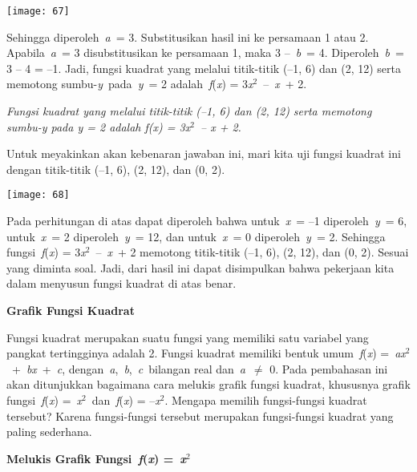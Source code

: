 \documentclass[11pt,fleqn]{book} %
\begin{document}
\begin{center}
\noindent \texttt{[image: 67]}
\end{center}

\noindent Sehingga diperoleh~\textit{a}~= 3. Substitusikan hasil ini ke persamaan 1 atau 2. Apabila~\textit{a}~= 3 disubstitusikan ke persamaan 1, maka 3 --~\textit{b}~= 4. Diperoleh~\textit{b}~= 3 -- 4 = --1. Jadi, fungsi kuadrat yang melalui titik-titik (--1, 6) dan (2, 12) serta memotong sumbu-\textit{y}~pada~\textit{y}~= 2 adalah~\textit{f}(\textit{x}) = 3\textit{x}${}^{2}$~--~\textit{x}~+ 2.

\noindent \textit{Fungsi kuadrat yang melalui titik-titik (--1, 6) dan (2, 12) serta memotong sumbu-y pada  y = 2 adalah f(x) = 3x${}^{2}$~-- x + 2.}

\noindent Untuk meyakinkan akan kebenaran jawaban ini, mari kita uji fungsi kuadrat ini dengan titik-titik (--1, 6), (2, 12), dan (0, 2).

\begin{center}
\noindent \texttt{[image: 68]}
\end{center}

\noindent Pada perhitungan di atas dapat diperoleh bahwa untuk~\textit{x}~= --1 diperoleh~\textit{y}~= 6, untuk~\textit{x}~= 2 diperoleh~\textit{y}~= 12, dan untuk~\textit{x}~= 0 diperoleh~\textit{y}~= 2. Sehingga fungsi~\textit{f}(\textit{x}) = 3\textit{x}${}^{2}$~--~\textit{x}~+ 2 memotong titik-titik (--1, 6), (2, 12), dan (0, 2). Sesuai yang diminta soal. Jadi, dari hasil ini dapat disimpulkan bahwa pekerjaan kita dalam menyusun fungsi kuadrat di atas benar.

\noindent \textbf{Grafik Fungsi Kuadrat}

\noindent Fungsi kuadrat merupakan suatu fungsi yang memiliki satu variabel yang pangkat tertingginya adalah 2. Fungsi kuadrat memiliki bentuk umum~\textit{f}(\textit{x}) =~\textit{ax}${}^{2}$~+~\textit{bx}~+~\textit{c}, dengan~\textit{a},~\textit{b},~\textit{c}~bilangan real dan~\textit{a}~$\mathrm{\neq}$ 0. Pada pembahasan ini akan ditunjukkan bagaimana cara melukis grafik fungsi kuadrat, khususnya grafik fungsi~\textit{f}(\textit{x}) =~\textit{x}${}^{2}$~dan~\textit{f}(\textit{x}) = --\textit{x}${}^{2}$. Mengapa memilih fungsi-fungsi kuadrat tersebut? Karena fungsi-fungsi tersebut merupakan fungsi-fungsi kuadrat yang paling sederhana.

\noindent \textbf{Melukis Grafik Fungsi~\textit{f}(\textit{x}) =~\textit{x}${}^{2}$}
\end{document}
